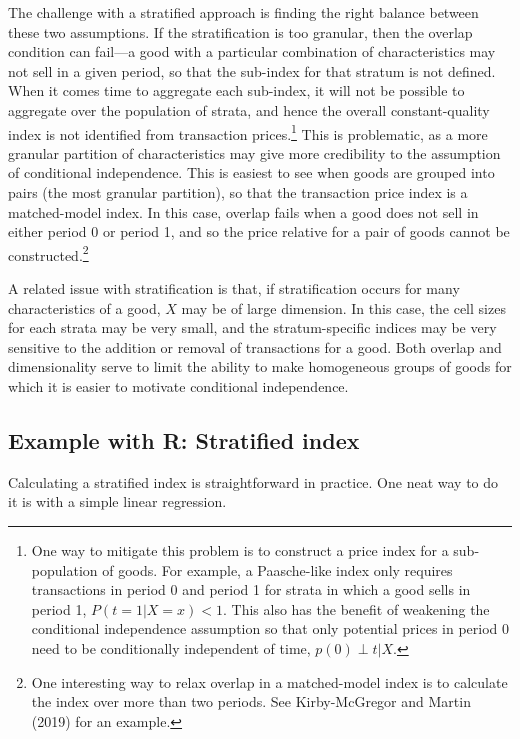 \documentclass[]{article}
\begin{document}
The challenge with a stratified approach is finding the right balance between these two assumptions. If the stratification is too granular, then the overlap condition can fail---a good with a particular combination of characteristics may not sell in a given period, so that the sub-index for that stratum is not defined. When it comes time to aggregate each sub-index, it will not be possible to aggregate over the population of strata, and hence the overall constant-quality index is not identified from transaction prices.\footnote{One way to mitigate this problem is to construct a price index for a sub-population of goods. For example, a Paasche-like index only requires transactions in period 0 and period 1 for strata in which a good sells in period 1, \(P(t = 1 | X = x) < 1\). This also has the benefit of weakening the conditional independence assumption so that only potential prices in period 0 need to be conditionally independent of time, \(p(0) \perp t | X\).} This is problematic, as a more granular partition of characteristics may give more credibility to the assumption of conditional independence. This is easiest to see when goods are grouped into pairs (the most granular partition), so that the transaction price index is a matched-model index. In this case, overlap fails when a good does not sell in either period 0 or period 1, and so the price relative for a pair of goods cannot be constructed.\footnote{One interesting way to relax overlap in a matched-model index is to calculate the index over more than two periods. See Kirby-McGregor and Martin (2019) for an example.}

A related issue with stratification is that, if stratification occurs for many characteristics of a good, \(X\) may be of large dimension. In this case, the cell sizes for each strata may be very small, and the stratum-specific indices may be very sensitive to the addition or removal of transactions for a good. Both overlap and dimensionality serve to limit the ability to make homogeneous groups of goods for which it is easier to motivate conditional independence.

\hypertarget{example-with-r-stratified-index}{%
\subsection{Example with R: Stratified index}\label{example-with-r-stratified-index}}

Calculating a stratified index is straightforward in practice. One neat way to do it is with a simple linear regression.
\end{document}
